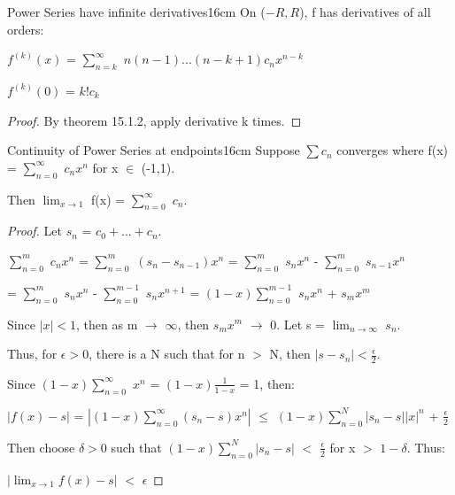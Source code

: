     \vspace{0.5cm}



    \begin{corollary}{Power Series have infinite derivatives}{16cm}
        On ($-R,R$), f has derivatives of all orders:

        \hspace{0.5cm}
        $f^{(k)}(x)$ = $\sum_{n=k}^{\infty}$ $n(n-1)...(n-k+1)c_nx^{n-k}$

        \hspace{0.5cm}
        $f^{(k)}(0)$ = $k!c_k$
    \end{corollary}

    \begin{proof}
        By {\color{red} theorem 15.1.2}, apply derivative k times.
    \end{proof}

    \vspace{0.5cm}



    \begin{wtheorem}{Continuity of Power Series at endpoints}{16cm}
        Suppose $\sum c_n$ converges where f(x) = $\sum_{n=0}^{\infty}$ $c_n x^n$
        for x $\in$ (-1,1).
        
        Then $\lim_{x \rightarrow 1}$ f(x) = $\sum_{n=0}^{\infty}$ $c_n$.
    \end{wtheorem}

    \begin{proof}
        Let $s_n$ = $c_0 + ... + c_n$.

        \hspace{0.5cm}
        $\sum_{n=0}^m$ $c_nx^n$
        = $\sum_{n=0}^m$ $(s_n - s_{n-1})x^n$
        = $\sum_{n=0}^m$ $s_nx^n$ - $\sum_{n=0}^m$ $s_{n-1}x^n$

        \hspace{2.6cm}
        = $\sum_{n=0}^m$ $s_nx^n$ - $\sum_{n=0}^{m-1}$ $s_nx^{n+1}$
        = $(1-x)\sum_{n=0}^{m-1}$ $s_nx^n$ + $s_mx^m$

        Since $|x| < 1$, then as m $\rightarrow$ $\infty$, then $s_mx^m$
        $\rightarrow$ 0. Let s = $\lim_{n \rightarrow \infty}$ $s_n$.

        Thus, for $\epsilon > 0$, there is a N such that for n $>$ N, then
        $|s - s_n| < \frac{\epsilon}{2}$.

        Since $(1-x) \sum_{n=0}^{\infty}$ $x^n$ = $(1-x)\frac{1}{1-x}$ = 1, then:

        \hspace{0.5cm}
        $|f(x) - s|$
        = $|(1-x) \sum_{n=0}^{\infty} (s_n-s)x^n|$
        $\leq$ $(1-x) \sum_{n=0}^N |s_n - s| |x|^n$ + $\frac{\epsilon}{2}$

        Then choose $\delta > 0$ such that
        $(1-x) \sum_{n=0}^N |s_n - s|$ $<$ $\frac{\epsilon}{2}$
        for x $>$ $1-\delta$. Thus:

        \hspace{0.5cm}
        $|\lim_{x \rightarrow 1} f(x) - s|$ $<$ $\epsilon$
    \end{proof}


